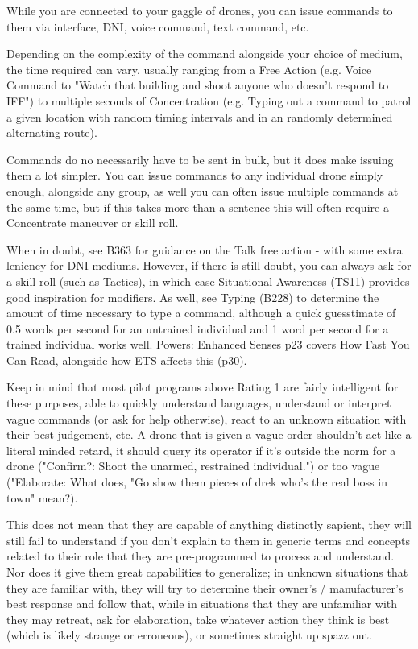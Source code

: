 \begin{multicols*}{3}
	While you are connected to your gaggle of drones, you can issue commands to them via interface, DNI, voice command, text command, etc. 
	
	Depending on the complexity of the command alongside your choice of medium, the time required can vary, usually ranging from a Free Action (e.g. Voice Command to "Watch that building and shoot anyone who doesn't respond to IFF") to multiple seconds of Concentration (e.g. Typing out a command to patrol a given location with random timing intervals and in an randomly determined alternating route).
	
	Commands do no necessarily have to be sent in bulk, but it does make issuing them a lot simpler. You can issue commands to any individual drone simply enough, alongside any group, as well you can often issue multiple commands at the same time, but if this takes more than a sentence this will often require a Concentrate maneuver or skill roll.
	
	When in doubt, see B363 for guidance on the Talk free action - with some extra leniency for DNI mediums. However, if there is still doubt, you can always ask for a skill roll (such as Tactics), in which case Situational Awareness (TS11) provides good inspiration for modifiers. As well, see Typing (B228) to determine the amount of time necessary to type a command, although a quick guesstimate of 0.5 words per second for an untrained individual and 1 word per second for a trained individual works well. Powers: Enhanced Senses p23 covers How Fast You Can Read, alongside how ETS affects this (p30).
	
	Keep in mind that most pilot programs above Rating 1 are fairly intelligent for these purposes, able to quickly understand languages, understand or interpret vague commands (or ask for help otherwise), react to an unknown situation with their best judgement, etc. A drone that is given a vague order shouldn't act like a literal minded retard, it should query its operator if it's outside the norm for a drone ("Confirm?: Shoot the unarmed, restrained individual.") or too vague ("Elaborate: What does, "Go show them pieces of drek who's the real boss in town" mean?). 
	
	This does not mean that they are capable of anything distinctly sapient, they will still fail to understand if you don't explain to them in generic terms and concepts related to their role that they are pre-programmed to process and understand. Nor does it give them great capabilities to generalize; in unknown situations that they are familiar with, they will try to determine their owner's / manufacturer's best response and follow that, while in situations that they are unfamiliar with they may retreat, ask for elaboration, take whatever action they think is best (which is likely strange or erroneous), or sometimes straight up spazz out.
	

\end{multicols*}
